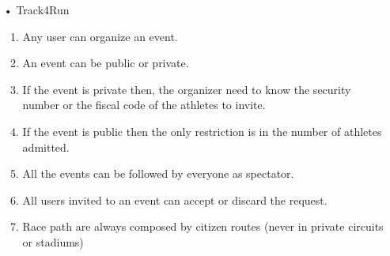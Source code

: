 \begin{enumerate}
\item[•] {\Large Track4Run}
	\begin{enumerate}
	\item Any user can organize an event.
    \item An event can be public or private.
    \item If the event is private then, the organizer need to know the security number or the fiscal code of the athletes to invite.
    \item If the event is public then the only restriction is in the number of athletes admitted.
    \item All the events can be followed by everyone as spectator.
    \item All users invited to an event can accept or discard the request.
    \item Race path are always composed by citizen routes (never in private circuits or stadiums)
    \end{enumerate}
\end{enumerate}

